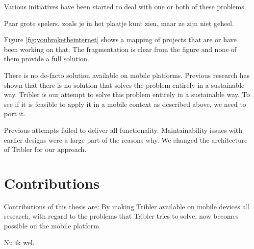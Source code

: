 Various initiatives have been started to deal with one or both of these problems. \cite{re_decentralize}

Paar grote spelers, zoals je in het plaatje kunt zien, maar ze zijn niet geheel.

Figure \ref{fig:youbroketheinternet} shows a mapping of projects that are or have been working on that.
The fragmentation is clear from the figure and none of them provide a full solution.



There is no de-facto solution available on mobile platforms. \cite{literature_survey}
Previous research has shown that there is no solution that solves the problem entirely in a sustainable way.
Tribler is our attempt to solve this problem entirely in a sustainable way.
To see if it is feasible to apply it in a mobile context as described above, we need to port it.

Previous attempts failed to deliver all functionality. \cite{bsc_1,2,3}
Maintainability issues with earlier designs were a large part of the reasons why.
We changed the architecture of Tribler for our approach.

\section{Contributions}
Contributions of this thesis are:
By making Tribler available on mobile devices all research, with regard to the problems that Tribler tries to solve, now becomes possible on the mobile platform.

Nu ik wel.
